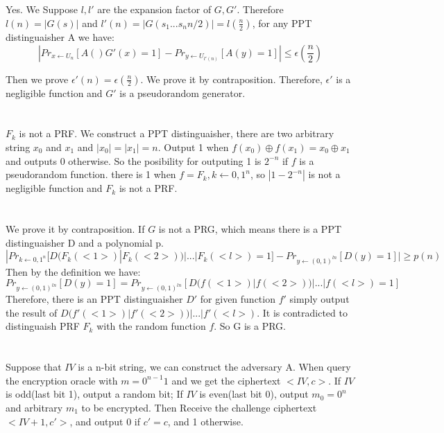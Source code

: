 \documentclass[onecolumn,oneside]{SUSTechHomework}
\begin{document}
    \subsection{}

    Yes. We Suppose $l, l'$ are the expansion factor of $G, G'$. Therefore $l(n) = |G(s)|$ and $l'(n) = |G(s_1...s_n{n/2})| = l(\frac{n}{2})$, for any PPT distinguaisher A we have:
    $$|Pr_{x \leftarrow U_n}[A()G'(x)=1] - Pr_{y \leftarrow U_{l'(n)}}[A(y)=1]| \le \epsilon (\frac{n}{2})$$

    Then we prove $\epsilon '(n) = \epsilon(\frac{n}{2})$. We prove it by contraposition.
    Therefore, $\epsilon '$ is a negligible function and $G'$ is a pseudorandom generator.

  \section{}

  $F_k$ is not a PRF.
  We construct a PPT distinguaisher, there are two arbitrary string $x_0$ and $x_1$ and $|x_0| = |x_1| = n$. Output 1 when $f(x_0) \oplus f(x_1) = x_0 \oplus x_1$ and outputs 0 otherwise.
  So the posibility for outputing 1 is $2^{-n}$ if $f$ is a pseudorandom function.
  there is 1 when $f=F_k, k \leftarrow {0,1}^n$, so $|1-2^{-n}|$ is not a negligible function and $F_k$ is not a PRF.

  \section{}

  We prove it by contraposition. If $G$ is not a PRG, which means there is a PPT distinguaisher D and a polynomial p.
  $$|Pr_{k \leftarrow {0,1}^n}[D(F_k(<1>)|F_k(<2>))|...|F_k(<l>)=1] - Pr_{y \leftarrow (0,1)^{ln}}[D(y)=1]| \ge p(n)$$
  Then by the definition we have:
  $$Pr_{y \leftarrow (0,1)^{ln}}[D(y)=1] = Pr_{y \leftarrow (0,1)^{ln}}[D(f(<1>)|f(<2>))|...|f(<l>)=1]$$
  Therefore, there is an PPT distinguaisher $D'$ for given function $f'$ simply output the result of $D(f'(<1>)|f'(<2>))|...|f'(<l>)$. It is contradicted to distinguaish PRF $F_k$ with the random function $f$.
  So G is a PRG.

  \section{}

  Suppose that $IV$ is a n-bit string, we can construct the adversary A. When query the encryption oracle with $m=0^{n-1}1$ and we get the ciphertext $<IV, c>$. If $IV$ is odd(last bit 1), output a random bit; If $IV$ is even(last bit 0), output $m_0 = 0^n$ and arbitrary $m_1$ to be encrypted. Then  Receive the challenge ciphertext $<IV+1, c'>$, and output 0 if $c'=c$, and 1 otherwise.
\end{document}
